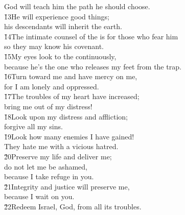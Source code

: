 \begin{poetry}
\poemll    God will teach him the path he should choose. \\
\poeml \v{13}He will experience good things; \\
\poemll    his descendants will inherit the earth. \\
\poeml \v{14}The intimate counsel of the  is for those who fear him \\
\poemll    so they may know his covenant. \\
\poeml \v{15}My eyes look to the  continuously, \\
\poemll    because he's the one who releases my feet from the trap. \\
\poeml \v{16}Turn toward me and have mercy on me, \\
\poemll    for I am lonely and oppressed. \\
\poeml \v{17}The troubles of my heart have increased; \\
\poemll    bring me out of my distress! \\
\poeml \v{18}Look upon my distress and affliction; \\
\poemll    forgive all my sins. \\
\poeml \v{19}Look how many enemies I have gained! \\
\poemll    They hate me with a vicious hatred. \\
\poeml \v{20}Preserve my life and deliver me; \\
\poemll    do not let me be ashamed, \\
\poemlll       because I take refuge in you. \\
\poeml \v{21}Integrity and justice will preserve me, \\
\poemll    because I wait on you. \\
\poeml \v{22}Redeem Israel, God, from all its troubles.
\end{poetry}

